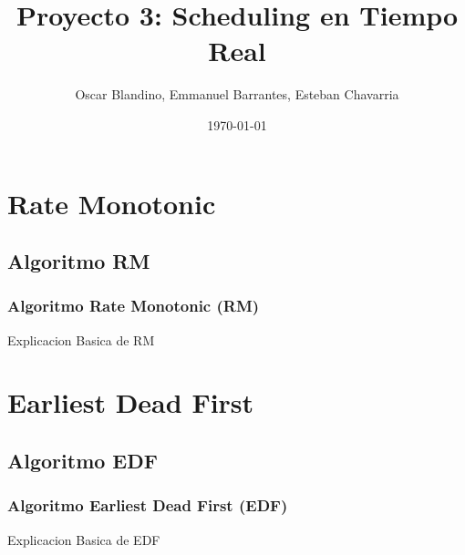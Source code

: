 \documentclass[xcolor=table]{beamer}
\title[Proyecto 3]{Proyecto 3: Scheduling en Tiempo Real} %
\author{Oscar Blandino, Emmanuel Barrantes, Esteban Chavarria} %
\institute[TEC] %
{
Tecnologico de Costa Rica \\ %
Sistemas Operativos Avanzados \\
I Semestre - 2018
\medskip
\textit{} %
}
\date{\today} %
\begin{document}
\begin{frame}
\titlepage %
\end{frame}



\section{Rate Monotonic}

\subsection{Algoritmo RM}

\begin{frame} 
\frametitle{Algoritmo Rate Monotonic (RM)} 
Explicacion Basica de RM \\
\end{frame}


\section{Earliest Dead First}

\subsection{Algoritmo EDF}

\begin{frame} 
\frametitle{Algoritmo Earliest Dead First (EDF)} 
Explicacion Basica de EDF \\
\end{frame}
\end{document}
